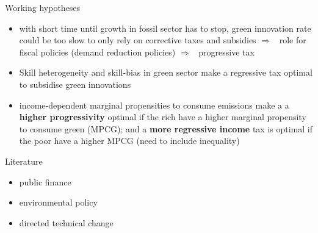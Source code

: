 \documentclass[11pt,aspectratio=169]{beamer}
\newcommand{\ar}{$\Rightarrow$ \ }
\begin{document}
\appendix
\begin{frame}{Working hypotheses}	
	\begin{itemize}
		\item<+-> with short time until growth in fossil sector has to stop, green innovation rate could be too slow to only rely on corrective taxes and subsidies \ar role for fiscal policies (demand reduction policies) \ar progressive tax
		\vspace{3mm}
		\item<+-> Skill heterogeneity and skill-bias in green sector make a regressive tax optimal to subsidise green innovations
		\vspace{3mm}
		\item<+-> income-dependent marginal propensities to consume emissions make a a \textbf{higher progressivity} optimal if the rich have a higher marginal propensity to consume green (MPCG); and a \textbf{more regressive income} tax is optimal if the poor have a higher MPCG (need to include inequality) 
	\end{itemize}
\end{frame}



\begin{frame}{Literature}
	\begin{itemize}
		\item public finance
		\item environmental policy
		\item directed technical change
	\end{itemize}
\end{frame}
\end{document}
